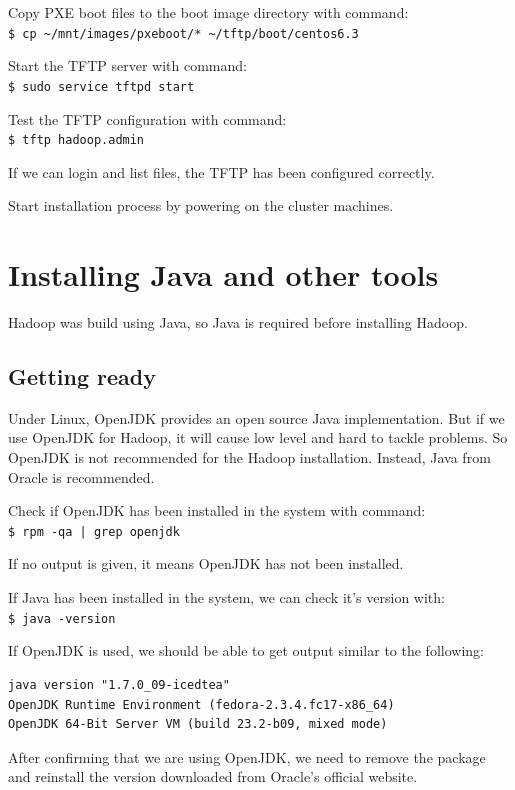 Copy PXE boot files to the boot image directory with command: \\
\verb|$ cp ~/mnt/images/pxeboot/* ~/tftp/boot/centos6.3|

Start the TFTP server with command: \\
\verb|$ sudo service tftpd start|

Test the TFTP configuration with command: \\
\verb|$ tftp hadoop.admin|

If we can login and list files, the TFTP has been configured correctly.

Start installation process by powering on the cluster machines.

\section{Installing Java and other tools}
Hadoop was build using Java, so Java is required before installing Hadoop.

\subsection*{Getting ready}
Under Linux, OpenJDK provides an open source Java implementation. But if we use OpenJDK for Hadoop, it will cause low level and hard to tackle problems. So OpenJDK is not recommended for the Hadoop installation. Instead, Java from Oracle is recommended.

Check if OpenJDK has been installed in the system with command: \\
\verb+$ rpm -qa | grep openjdk+

If no output is given, it means OpenJDK has not been installed.

If Java has been installed in the system, we can check it's version with: \\
\verb|$ java -version|

If OpenJDK is used, we should be able to get output similar to the following:

\lstset{style=bashstyle}
\begin{lstlisting}
java version "1.7.0_09-icedtea"
OpenJDK Runtime Environment (fedora-2.3.4.fc17-x86_64)
OpenJDK 64-Bit Server VM (build 23.2-b09, mixed mode)
\end{lstlisting}

After confirming that we are using OpenJDK, we need to remove the package and reinstall the version downloaded from Oracle's official website.


